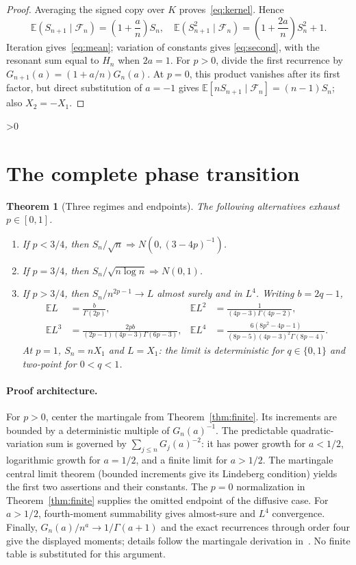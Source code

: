 \documentclass[9pt]{extarticle}
\newtheorem{theorem}{Theorem}
\newcommand{\E}{\mathbb E}
\newcommand{\F}{\mathcal F}
\begin{document}
\begin{proof}
Averaging the signed copy over $K$ proves~\eqref{eq:kernel}.  Hence
\[
 \E(S_{n+1}\mid\F_n)=\left(1+\frac an\right)S_n,
 \quad
 \E(S_{n+1}^2\mid\F_n)=\left(1+\frac{2a}{n}\right)S_n^2+1.
\]
Iteration gives~\eqref{eq:mean}; variation of constants gives
\eqref{eq:second}, with the resonant sum equal to $H_n$ when $2a=1$.
For $p>0$, divide the first recurrence by
$G_{n+1}(a)=(1+a/n)G_n(a)$.  At $p=0$, this product vanishes after its
first factor, but direct substitution of $a=-1$ gives
$\E[nS_{n+1}\mid\F_n]=(n-1)S_n$; also $X_2=-X_1$.
\end{proof}

\ifnum\CRevisionRound>0
\section{The complete phase transition}
\begin{theorem}[Three regimes and endpoints]\label{thm:phase}
The following alternatives exhaust $p\in[0,1]$.
\begin{enumerate}
\item If $p<3/4$, then
$S_n/\sqrt n\Rightarrow N(0,(3-4p)^{-1})$.
\item If $p=3/4$, then
$S_n/\sqrt{n\log n}\Rightarrow N(0,1)$.
\item If $p>3/4$, then $S_n/n^{2p-1}\to L$ almost surely and in
$L^4$.  Writing $b=2q-1$,
\begin{align*}
 \E L&=\frac b{\Gamma(2p)},&
 \E L^2&=\frac1{(4p-3)\Gamma(4p-2)},\\
 \E L^3&=\frac{2pb}{(2p-1)(4p-3)\Gamma(6p-3)},&
 \E L^4&=\frac{6(8p^2-4p-1)}{(8p-5)(4p-3)^2\Gamma(8p-4)}.
\end{align*}
At $p=1$, $S_n=nX_1$ and $L=X_1$: the limit is deterministic for
$q\in\{0,1\}$ and two-point for $0<q<1$.
\end{enumerate}
\end{theorem}

\paragraph{Proof architecture.}
For $p>0$, center the martingale from Theorem~\ref{thm:finite}.
Its increments are bounded by a deterministic multiple of $G_n(a)^{-1}$.
The predictable quadratic-variation sum is governed by
$\sum_{j\leq n}G_j(a)^{-2}$: it has power growth for $a<1/2$,
logarithmic growth for $a=1/2$, and a finite limit for $a>1/2$.
The martingale central limit theorem (bounded increments give its
Lindeberg condition) yields the first two assertions and their constants.
The $p=0$ normalization in Theorem~\ref{thm:finite} supplies the omitted
endpoint of the diffusive case.  For $a>1/2$, fourth-moment summability
gives almost-sure and $L^4$ convergence.  Finally,
$G_n(a)/n^a\to1/\Gamma(a+1)$ and the exact recurrences through order four
give the displayed moments; details follow the martingale derivation
in~\cite{bercu}.  No finite table is substituted for this argument.
\end{document}

